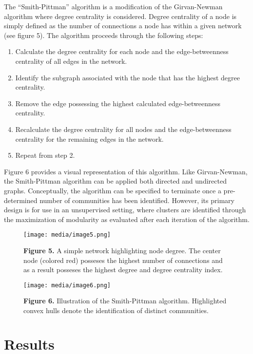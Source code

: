 The ``Smith-Pittman'' algorithm is a modification of the Girvan-Newman
algorithm where degree centrality is considered. Degree centrality of a
node is simply defined as the number of connections a node has within a
given network (see figure 5). The algorithm proceeds through the
following steps:

\begin{enumerate}
\def\labelenumi{\arabic{enumi}.}
\item
  Calculate the degree centrality for each node and the edge-betweenness
  centrality of all edges in the network.
\item
  Identify the subgraph associated with the node that has the highest
  degree centrality.
\item
  Remove the edge possessing the highest calculated edge-betweenness
  centrality.
\item
  Recalculate the degree centrality for all nodes and the
  edge-betweenness centrality for the remaining edges in the network.
\item
  Repeat from step 2.
\end{enumerate}

Figure 6 provides a visual representation of this algorithm. Like
Girvan-Newman, the Smith-Pittman algorithm can be applied both directed
and undirected graphs. Conceptually, the algorithm can be specified to
terminate once a pre-determined number of communities has been
identified. However, its primary design is for use in an unsupervised
setting, where clusters are identified through the maximization of
modularity as evaluated after each iteration of the algorithm.

\begin{figure}
\centering
\texttt{[image: media/image5.png]}
\caption{\textbf{Figure 5.} A simple network highlighting node degree.
The center node (colored red) posseses the highest number of connections
and as a result posseses the highest degree and degree centrality
index.}
\end{figure}

\begin{figure}
\centering
\texttt{[image: media/image6.png]}
\caption{\textbf{Figure 6.} Illustration of the Smith-Pittman algorithm.
Highlighted convex hulls denote the identification of distinct
communities.}
\end{figure}

\section{Results}\label{results}

